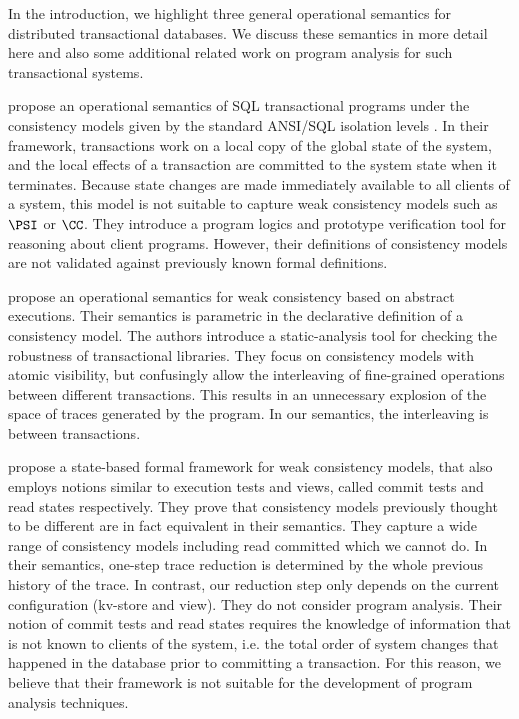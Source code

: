 In the introduction, we highlight three general operational semantics for 
distributed transactional databases. We discuss these semantics in more detail here 
and also some additional related work on program analysis for such transactional 
systems.

 propose an operational semantics of SQL transactional programs 
under the consistency models given by the standard ANSI/SQL isolation levels \cite{si}.
In their  framework, transactions work on a local copy of the global state 
of the system, and the local effects of a transaction are committed to the  
system state when it terminates. Because state changes 
are made immediately available to all clients of a system, this model 
is not suitable to capture weak consistency models such as \(\PSI\) or \(\CC\). 
They introduce a program logics and prototype verification tool for reasoning 
about client programs. However, their definitions of consistency models 
are not validated against previously known 
formal definitions.

 propose an operational semantics for weak consistency 
based on abstract executions. Their semantics 
is parametric in the declarative definition of a consistency model. 
The authors introduce a static-analysis tool for checking the robustness of transactional  
libraries.
They focus on consistency models with atomic visibility, but confusingly allow 
the interleaving of fine-grained operations between different transactions. 
This results in an unnecessary explosion of the space of traces generated by 
the program. In our semantics, the interleaving is between transactions.

 propose a state-based formal framework for weak consistency models, 
that also employs notions similar to execution tests and views, called commit tests and read states 
respectively.
They prove that consistency models previously thought to be different 
are in fact equivalent in their semantics.
They capture 
a wide range of consistency models including read committed which we cannot do. 
In their semantics, one-step trace reduction is determined by the whole previous history of the trace. 
In contrast, our reduction step only depends on the current configuration (kv-store and view).
They do not consider program analysis. Their notion of commit tests and read states requires 
the knowledge of information that is not known to clients of the system, i.e. the total order of system changes that happened in the database 
prior to committing a transaction. For this reason, we believe that their framework is not suitable for the development of program analysis techniques.

